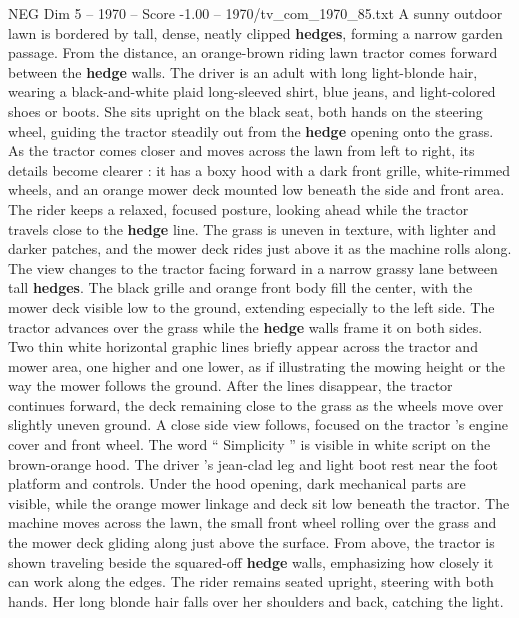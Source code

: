 \begin{textsample}{NEG Dim 5 – 1970 – Score -1.00 – 1970/tv\_com\_1970\_85.txt}  \label{ex:f5_neg_007}
A sunny outdoor lawn is bordered by tall, dense, neatly clipped \textbf{hedges}, forming a narrow garden passage.
From the distance, an orange-brown riding lawn tractor comes forward between the \textbf{hedge} walls.
The driver is an adult with long light-blonde hair, wearing a black-and-white plaid long-sleeved shirt, blue jeans, and light-colored shoes or boots.
She sits upright on the black seat, both hands on the steering wheel, guiding the tractor steadily out from the \textbf{hedge} opening onto the grass.
As the tractor comes closer and moves across the lawn from left to right, its details become clearer : it has a boxy hood with a dark front grille, white-rimmed wheels, and an orange mower deck mounted low beneath the side and front area.
The rider keeps a relaxed, focused posture, looking ahead while the tractor travels close to the \textbf{hedge} line.
The grass is uneven in texture, with lighter and darker patches, and the mower deck rides just above it as the machine rolls along.
The view changes to the tractor facing forward in a narrow grassy lane between tall \textbf{hedges}.
The black grille and orange front body fill the center, with the mower deck visible low to the ground, extending especially to the left side.
The tractor advances over the grass while the \textbf{hedge} walls frame it on both sides.
Two thin white horizontal graphic lines briefly appear across the tractor and mower area, one higher and one lower, as if illustrating the mowing height or the way the mower follows the ground.
After the lines disappear, the tractor continues forward, the deck remaining close to the grass as the wheels move over slightly uneven ground.
A close side view follows, focused on the tractor ’s engine cover and front wheel.
The word “ Simplicity ” is visible in white script on the brown-orange hood.
The driver ’s jean-clad leg and light boot rest near the foot platform and controls.
Under the hood opening, dark mechanical parts are visible, while the orange mower linkage and deck sit low beneath the tractor.
The machine moves across the lawn, the small front wheel rolling over the grass and the mower deck gliding along just above the surface.
From above, the tractor is shown traveling beside the squared-off \textbf{hedge} walls, emphasizing how closely it can work along the edges.
The rider remains seated upright, steering with both hands.
Her long blonde hair falls over her shoulders and back, catching the light.

\end{textsample}
